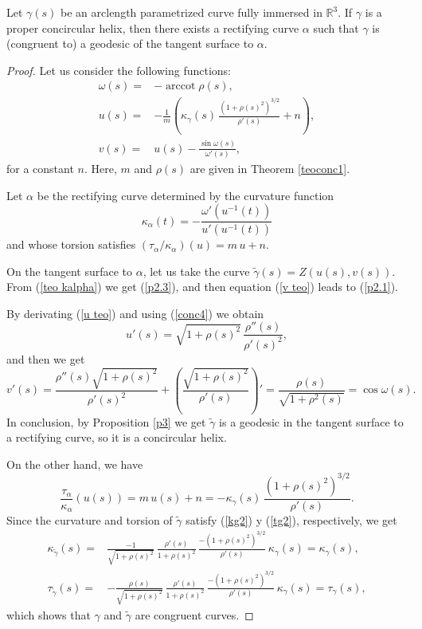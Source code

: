 \documentclass[eqnumis, pdf]{hjms}
\def\R#1{\ensuremath{\mathbb{R}^{#1}}}
\def\Y{Z}
\DeclareMathOperator{\arccot}{arccot}
\def\tgamma{\widetilde{\gamma}}
\begin{document}
\begin{theorem}\label{th1}
Let $\gamma(s)$ be an arclength parametrized curve fully immersed in $\R3$. If $\gamma$ is a proper concircular helix, then there exists a rectifying curve $\alpha$ such that $\gamma$ is (congruent to) a geodesic of the tangent surface to $\alpha$.
\end{theorem}
\begin{proof}
Let us consider the following functions:
\begin{align}
\omega(s)= & -\arccot\rho(s), \label{w teo}\\
u(s)= & -\frac{1}{m}\left(\kappa_\gamma(s)\,\frac{(1+\rho(s)^2)^{3/2}}{\rho'(s)}+n\right), \label{u teo}\\
v(s)= & u(s)-\frac{\sin\omega(s)}{\omega'(s)}, \label{v teo}
\end{align}
for a constant $n$. Here, $m$ and $\rho(s)$ are given in Theorem \ref{teoconc1}.

Let $\alpha$ be the rectifying curve determined by the curvature function
\begin{equation}\label{teo kalpha}
  \kappa_\alpha(t)=-\frac{\omega'(u^{-1}(t))}{u'(u^{-1}(t))}
\end{equation}
and whose torsion satisfies $(\tau_\alpha/\kappa_\alpha)(u)=m\,u+n$.

On the tangent surface to $\alpha$, let us take the curve $\tgamma(s)=\Y(u(s),v(s))$. From (\ref{teo kalpha}) we get (\ref{p2.3}), and then equation (\ref{v teo}) leads to (\ref{p2.1}).

By derivating (\ref{u teo}) and using (\ref{conc4}) we obtain
\[
u'(s)=\sqrt{1+\rho(s)^2}\,\frac{\rho''(s)}{\rho'(s)^2},
\]
and then we get
\[
v'(s)=\frac{\rho''(s)\sqrt{1+\rho(s)^2}}{\rho'(s)^2}+ \left(\frac{\sqrt{1+\rho(s)^2}}{\rho'(s)}\right)'
   =\frac{\rho(s)}{\sqrt{1+\rho^2(s)}}=\cos\omega(s).
\]
In conclusion, by Proposition \ref{p3} we get $\tgamma$ is a geodesic in the tangent surface to a rectifying curve, so it is a concircular helix.

On the other hand, we have
\begin{equation*}
  \frac{\tau_\alpha}{\kappa_\alpha}(u(s))=m\,u(s)+n=-\kappa_\gamma(s)\,\frac{(1+\rho(s)^2)^{3/2}}{\rho'(s)}.
\end{equation*}
Since the curvature and torsion of $\tilde\gamma$ satisfy (\ref{kg2}) y (\ref{tg2}), respectively, we get
\begin{align*}
  \kappa_{\tgamma}(s)= &  \frac{-1}{\sqrt{1+\rho(s)^2}}\,\frac{\rho'(s)}{1+\rho(s)^2}\,\frac{-(1+\rho(s)^2)^{3/2}}{\rho'(s)}\,\kappa_\gamma(s)=\kappa_\gamma(s),\\
  \tau_{\tgamma}(s)= &  -\frac{\rho(s)}{\sqrt{1+\rho(s)^2}}\,\frac{\rho'(s)}{1+\rho(s)^2}\,\frac{-(1+\rho(s)^2)^{3/2}}{\rho'(s)}\,\kappa_\gamma(s)=\tau_\gamma(s),
\end{align*}
which shows that $\gamma$ and $\tgamma$ are congruent curves.
\end{proof}
\end{document}
